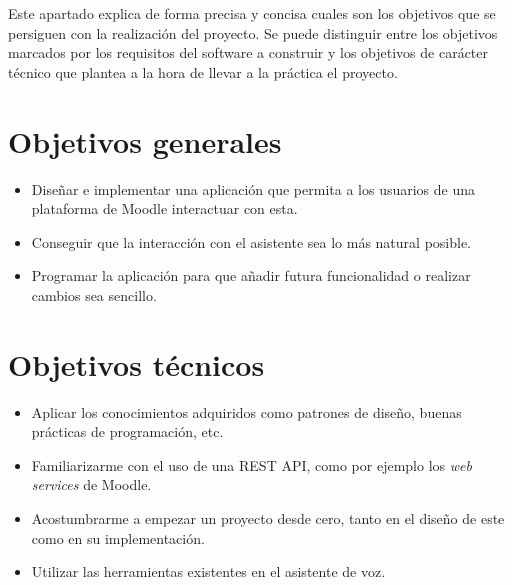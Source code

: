 
Este apartado explica de forma precisa y concisa cuales son los objetivos que se persiguen con la realización del proyecto. Se puede distinguir entre los objetivos marcados por los requisitos del software a construir y los objetivos de carácter técnico que plantea a la hora de llevar a la práctica el proyecto.

\section{Objetivos generales}

\begin{itemize}
	\item Diseñar e implementar una aplicación que permita a los usuarios de una plataforma de Moodle interactuar con esta.
	\item Conseguir que la interacción con el asistente sea lo más natural posible.
	\item Programar la aplicación para que añadir futura funcionalidad o realizar cambios sea sencillo.
\end{itemize}

\section{Objetivos técnicos}

\begin{itemize}
	\item Aplicar los conocimientos adquiridos como patrones de diseño, buenas prácticas de programación, etc.
	\item Familiarizarme con el uso de una REST API, como por ejemplo los \textit{web services} de Moodle.
	\item Acostumbrarme a empezar un proyecto desde cero, tanto en el diseño de este como en su implementación.
	\item Utilizar las herramientas existentes en el asistente de voz.
\end{itemize}